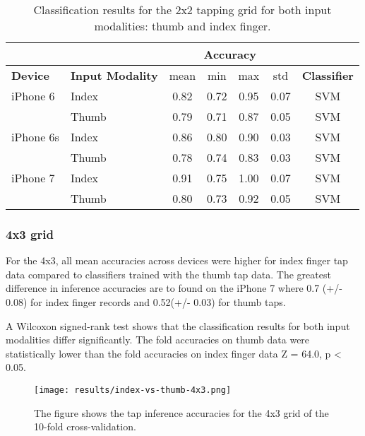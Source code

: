 \begin{appendix}
\begin{table}[h!]
  \centering
\begin{tabular}{|l|l|c|c|c|c|c|}
  \cline{3-6}
  \multicolumn{2}{c}{} & \multicolumn{4}{|c|}{\textbf{Accuracy}}  \\
  \hline
  \textbf{Device} & \textbf{Input Modality} & mean &   min &   max  & std &  \textbf{Classifier} \\
  \hline
	iPhone 6 & Index &      0.82 &     0.72 &     0.95 &     0.07 &  SVM \\
	& Thumb &      0.79 &     0.71 &     0.87 &     0.05 &  SVM \\
	\hline
iPhone 6s & Index &      0.86 &     0.80 &     0.90 &     0.03 &  SVM \\
	& Thumb &      0.78 &     0.74 &     0.83 &     0.03 &  SVM \\
	\hline
	iPhone 7 & Index &      0.91 &     0.75 &     1.00 &     0.07 &  SVM \\
	& Thumb &      0.80 &     0.73 &     0.92 &     0.05 &  SVM \\
	\hline
\end{tabular}
  \caption{Classification results for the 2x2 tapping grid for both input modalities: thumb and index finger.}
\end{table}

\subsubsection*{4x3 grid}
For the 4x3, all mean accuracies across devices were higher for index finger tap data compared to classifiers trained with the thumb tap data. The greatest difference in inference accuracies are to found on the iPhone 7 where 0.7 (+/- 0.08) for index finger records and 0.52(+/- 0.03) for thumb taps.

A Wilcoxon signed-rank test shows that the classification results for both input modalities differ significantly. The fold accuracies on thumb data were statistically lower than the fold accuracies on index finger data Z = 64.0, p < 0.05.


\begin{figure}[h!]
  \centering
  \texttt{[image: results/index-vs-thumb-4x3.png]}
  \caption{The figure shows the tap inference accuracies for the 4x3 grid of the 10-fold cross-validation.} \label{fig:participation}
\end{figure}


\end{appendix}
